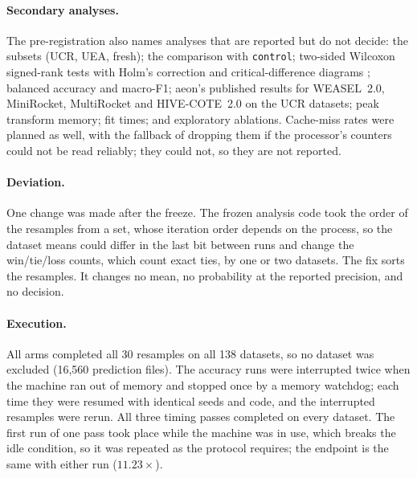 \paragraph{Secondary analyses.} The pre-registration also names analyses that are reported
but do not decide: the subsets (UCR, UEA, fresh); the comparison with \texttt{control};
two-sided Wilcoxon signed-rank tests with Holm's correction and critical-difference
diagrams \citep{demsar2006statistical}; balanced accuracy and macro-F1; aeon's published
results for WEASEL~2.0, MiniRocket, MultiRocket and HIVE-COTE~2.0 on the UCR datasets;
peak transform memory; fit times; and exploratory ablations. Cache-miss rates were planned
as well, with the fallback of dropping them if the processor's counters could not be read
reliably; they could not, so they are not reported.

\paragraph{Deviation.} One change was made after the freeze. The frozen analysis code took
the order of the resamples from a set, whose iteration order depends on the process, so the
dataset means could differ in the last bit between runs and change the win/tie/loss counts,
which count exact ties, by one or two datasets. The fix sorts the resamples. It changes no
mean, no probability at the reported precision, and no decision.

\paragraph{Execution.} All arms completed all 30 resamples on all 138 datasets, so no
dataset was excluded (16,560 prediction files). The accuracy runs were interrupted twice
when the machine ran out of memory and stopped once by a memory watchdog; each time they
were resumed with identical seeds and code, and the interrupted resamples were rerun. All three
timing passes completed on every dataset. The first run of one pass took place while the
machine was in use, which breaks the idle condition, so it was repeated as the protocol
requires; the endpoint is the same with either run ($11.23\times$).
